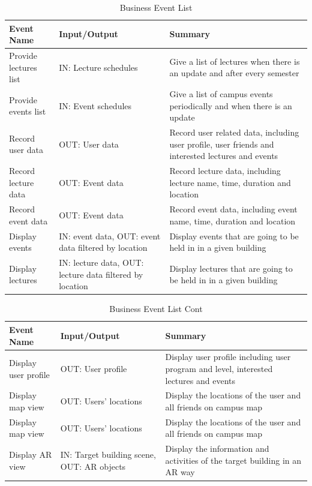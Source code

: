 \documentclass[12pt]{article}
\begin{document}
\begin{table}[H]
  \begin{tabular}{p{} | p{} | p{}}
  \toprule
  \textbf{Event Name} & \textbf{Input/Output} & \textbf{Summary}\\
  \midrule
  Provide lectures list & IN: Lecture schedules & Give a list of lectures when there is an update and after every semester\\
  \midrule
  Provide events list & IN: Event schedules & Give a list of campus events periodically and when there is an update\\
  \midrule
  Record user data & OUT: User data & Record user related data, including user profile, user friends and interested lectures and events\\
  \midrule
  Record lecture data & OUT: Event data & Record lecture data, including lecture name,  time, duration and location\\
  \midrule
    Record event data & OUT: Event data & Record event data, including event name,  time,  duration and location\\
  \midrule
  Display events & IN: event data, OUT: event data filtered by location & Display events that are going to be held in in a given building\\
  \midrule
  Display lectures & IN: lecture data, OUT: lecture data filtered by location & Display lectures that are going to be held in in a given building\\
    \bottomrule
\end{tabular}
 \caption{Business Event List} 
 \label{TblEventList}
\end{table}
\begin{table}[H]
  \begin{tabular}{p{} | p{} | p{}}
  \toprule
    \textbf{Event Name} & \textbf{Input/Output} & \textbf{Summary}\\
  \midrule
  Display user profile & OUT: User profile & Display user profile including user program and level, interested lectures and events\\
    \midrule
  Display map view & OUT: Users' locations & Display the locations of the user and all friends on campus map\\
    \midrule
  Display map view & OUT: Users' locations & Display the locations of the user and all friends on campus map\\
    \midrule
  Display AR view & IN: Target building scene, OUT: AR objects & Display the information and activities of the target building in an AR way\\
  \bottomrule
\end{tabular}
 \caption{Business Event List Cont} 
 \label{TblEventListCont}
\end{table}
\end{document}
